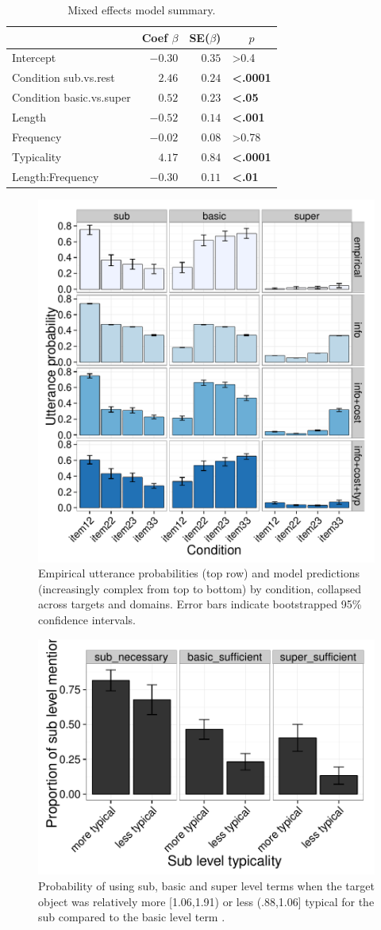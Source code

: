 \documentclass[10pt,letterpaper]{article}
\begin{document}
\begin{table}[!tbp]
\caption{Mixed effects model summary.}
\begin{center}
\begin{tabular}{lrrl}
\toprule
\multicolumn{1}{l}{}&\multicolumn{1}{c}{Coef $\beta$}&\multicolumn{1}{c}{SE($\beta$)}&\multicolumn{1}{c}{$p$}\tabularnewline
\midrule
Intercept&$-0.30$&$0.35$&\textgreater0.4\tabularnewline
Condition sub.vs.rest&$ 2.46$&$0.24$&\textbf{\textless.0001}\tabularnewline
Condition basic.vs.super&$ 0.52$&$0.23$&\textbf{\textless.05}\tabularnewline
Length&$-0.52$&$0.14$&\textbf{\textless.001}\tabularnewline
Frequency&$-0.02$&$0.08$&\textgreater0.78\tabularnewline
Typicality&$ 4.17$&$0.84$&\textbf{\textless.0001}\tabularnewline
Length:Frequency&$-0.30$&$0.11$&\textbf{\textless.01}\tabularnewline
\bottomrule
\end{tabular}\end{center}
\label{tab:modelresults}
\end{table}


\begin{figure}[ht!]
\centering
\includegraphics[width=.5\textwidth]{graphs/collapsed-pattern}
\caption{Empirical utterance probabilities (top row) and model predictions (increasingly complex from top to bottom) by condition, collapsed across targets and domains. Error bars indicate bootstrapped 95\% confidence intervals.}
\label{fig:qualitativemodel}
\end{figure}

\begin{figure}[ht!]
\centering
\includegraphics[width=.5\textwidth]{graphs/typicality-effect}
\caption{Probability of using sub, basic and super level terms when the target object was relatively more [1.06,1.91) or less (.88,1.06] typical for the sub compared to the basic level term .}
 \label{fig:typicalityeffect}
\end{figure}
\end{document}
